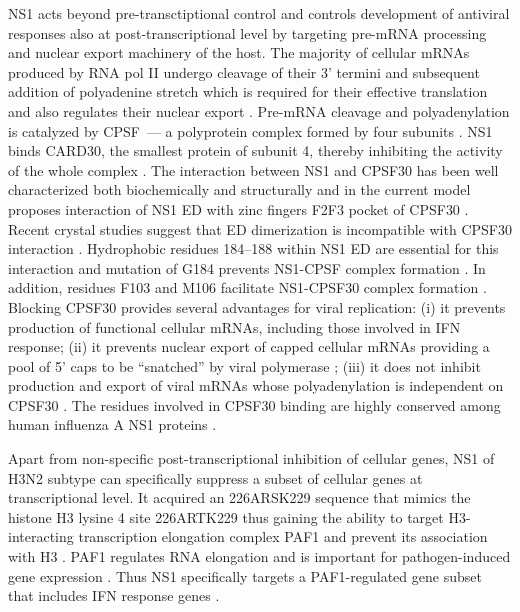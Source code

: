 		NS1 acts beyond pre-transctiptional control and controls development of antiviral responses also at post-transcriptional level by targeting pre-mRNA processing and nuclear export machinery of the host.
		The majority of cellular mRNAs produced by RNA pol II undergo cleavage of their 3' termini and subsequent addition of polyadenine stretch which is required for their effective translation and also regulates their nuclear export \parencite{Vassalli1989, Zarkower1987, Huang1996}. Pre-mRNA cleavage and polyadenylation is catalyzed by \gls{CPSF}~--- a polyprotein complex formed by four subunits \parencite{Wilusz1990, Colgan1997}. NS1 binds \gls{CARD}30, the smallest protein of subunit 4, thereby inhibiting the activity of the whole complex \parencite{Nemeroff1998}. The interaction between NS1 and CPSF30 has been well characterized both biochemically and structurally and in the current model proposes interaction of NS1 ED with zinc fingers F2F3 pocket of \gls{CPSF}30 \parencite{Noah2003, Twu2006, Kochs2007, Das2008}. Recent crystal studies suggest that ED dimerization is incompatible with \gls{CPSF}30 interaction \parencite{Aramini2011, Kerry2011}. Hydrophobic residues 184--188 within NS1 ED are essential for this interaction and mutation of G184 prevents NS1-CPSF complex formation \parencite{Das2008}. In addition, residues F103 and M106 facilitate NS1-CPSF30 complex formation \parencite{Kochs2007, Das2008}. Blocking \gls{CPSF}30 provides several advantages for viral replication: (i) it prevents production of functional cellular mRNAs, including those involved in \gls{IFN} response; (ii) it prevents nuclear export of capped cellular mRNAs providing a pool of 5' caps to be ``snatched'' by viral polymerase \parencite{Nemeroff1998}; (iii) it does not inhibit production and export of viral mRNAs whose polyadenylation is independent on \gls{CPSF}30 \parencite{Plotch1977}. The residues involved in \gls{CPSF}30 binding are highly conserved among human influenza A NS1 proteins \parencite{Kochs2007, Das2008}.
		
		Apart from non-specific post-transcriptional inhibition of cellular genes, NS1 of H3N2 subtype can specifically suppress a subset of cellular genes at transcriptional level. It acquired an \textsc{226}ARSK\textsc{229} sequence that mimics the histone H3 lysine 4 site \textsc{226}ARTK\textsc{229} thus gaining the ability to target  H3-interacting transcription elongation complex PAF1 and prevent its association with H3 \parencite{Marazzi2012}. PAF1 regulates RNA elongation and is important for pathogen-induced gene expression \parencite{Newey2009}. Thus NS1 specifically targets a PAF1-regulated gene subset that includes \gls{IFN} response genes \parencite{Marazzi2012}.
		
